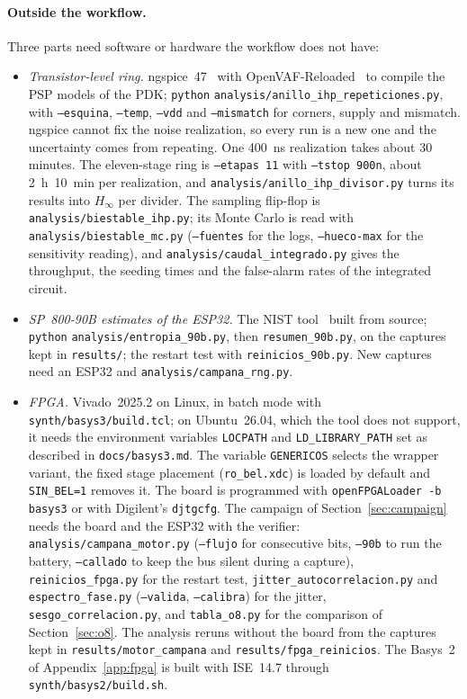 \paragraph{Outside the workflow.} Three parts need software or hardware
the workflow does not have:
\begin{itemize}
\item \emph{Transistor-level ring.} ngspice~47~\cite{ngspice_47} with
  OpenVAF-Reloaded~\cite{openvaf_reloaded} to compile the PSP models of
  the \ac{PDK}; \texttt{python} \nolinkurl{analysis/anillo_ihp_repeticiones.py},
  with \texttt{--esquina}, \texttt{--temp}, \texttt{--vdd} and
  \texttt{--mismatch} for corners, supply and mismatch. ngspice cannot
  fix the noise realization, so every run is a new one and the
  uncertainty comes from repeating. One 400~ns realization takes about
  30 minutes. The eleven-stage ring is \texttt{--etapas 11} with
  \texttt{--tstop 900n}, about 2~h~10~min per realization, and
  \nolinkurl{analysis/anillo_ihp_divisor.py} turns its results into
  $H_\infty$ per divider. The sampling flip-flop is
  \nolinkurl{analysis/biestable_ihp.py}; its Monte Carlo is read with
  \nolinkurl{analysis/biestable_mc.py} (\texttt{--fuentes} for the logs,
  \texttt{--hueco-max} for the sensitivity reading), and
  \nolinkurl{analysis/caudal_integrado.py} gives the throughput, the
  seeding times and the false-alarm rates of the integrated circuit.
\item \emph{SP~800-90B estimates of the ESP32.} The \ac{NIST}
  tool~\cite{nist_ea_github} built from source;
  \texttt{python} \nolinkurl{analysis/entropia_90b.py}, then
  \texttt{resumen\_90b.py}, on the captures kept in \nolinkurl{results/};
  the restart test with \texttt{reinicios\_90b.py}. New captures need an
  ESP32 and \nolinkurl{analysis/campana_rng.py}.
\item \emph{\ac{FPGA}.} Vivado~2025.2 on Linux, in batch mode with
  \nolinkurl{synth/basys3/build.tcl}; on Ubuntu~26.04, which the tool does
  not support, it needs the environment variables \texttt{LOCPATH} and
  \texttt{LD\_LIBRARY\_PATH} set as described in
  \nolinkurl{docs/basys3.md}. The variable \texttt{GENERICOS} selects the
  wrapper variant, the fixed stage placement (\texttt{ro\_bel.xdc}) is
  loaded by default and \texttt{SIN\_BEL=1} removes it. The board is
  programmed with \texttt{openFPGALoader -b basys3} or with Digilent's
  \texttt{djtgcfg}. The campaign of Section~\ref{sec:campaign} needs the
  board and the ESP32 with the verifier:
  \nolinkurl{analysis/campana_motor.py} (\texttt{--flujo} for consecutive
  bits, \texttt{--90b} to run the battery, \texttt{--callado} to keep the
  bus silent during a capture), \texttt{reinicios\_fpga.py} for the
  restart test, \texttt{jitter\_autocorrelacion.py} and
  \texttt{espectro\_fase.py} (\texttt{--valida}, \texttt{--calibra}) for
  the jitter, \texttt{sesgo\_correlacion.py}, and \texttt{tabla\_o8.py}
  for the comparison of Section~\ref{sec:o8}. The analysis reruns without
  the board from the captures kept in \nolinkurl{results/motor_campana}
  and \nolinkurl{results/fpga_reinicios}. The Basys~2 of
  Appendix~\ref{app:fpga} is built with ISE~14.7 through
  \nolinkurl{synth/basys2/build.sh}.
\end{itemize}

